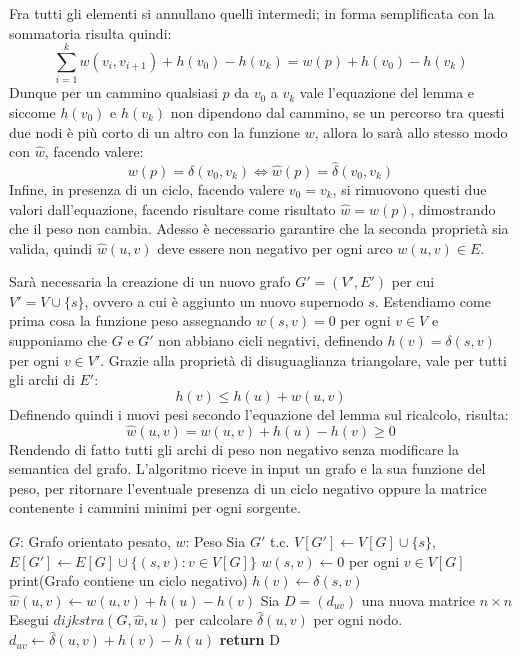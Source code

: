 \noindent Fra tutti gli elementi si annullano quelli intermedi; in forma semplificata con la sommatoria risulta quindi: \[
\sum_{i=1}^k w(v_i, v_{i+1}) + h(v_0) - h(v_k) = w(p) + h(v_0) - h(v_k)
\]
\noindent Dunque per un cammino qualsiasi $p$ da $v_0$ a $v_k$ vale l'equazione del lemma e siccome $h(v_0)$ e $h(v_k)$ non dipendono dal cammino, se
un percorso tra questi due nodi è più corto di un altro con la funzione $w$, allora lo sarà allo stesso modo con $\hat{w}$, facendo valere: \[
w(p) = \delta(v_0, v_k) \iff \hat{w}(p) = \hat{\delta}(v_0, v_k)
\]
\noindent Infine, in presenza di un ciclo, facendo valere $v_0 = v_k$, si rimuovono questi due valori dall'equazione, facendo risultare come risultato
$\hat{w} = w(p)$, dimostrando che il peso non cambia. Adesso è necessario garantire che la seconda proprietà sia valida, quindi $\hat{w}(u, v)$ deve
essere non negativo per ogni arco $w(u,v)\in E$.\par
Sarà necessaria la creazione di un nuovo grafo $G' = (V', E')$ per cui $V' = V \cup \{s\}$, ovvero a cui è aggiunto un nuovo supernodo $s$. Estendiamo
come prima cosa la funzione peso assegnando $w(s, v) = 0$ per ogni $v\in V$ e supponiamo che $G$ e $G'$ non abbiano cicli negativi, definendo
$h(v) = \delta(s,v)$ per ogni $v\in V'$. Grazie alla proprietà di disuguaglianza triangolare, vale per tutti gli archi di $E'$: \[
h(v) \leq h(u) + w(u,v)
\]
\noindent Definendo quindi i nuovi pesi secondo l'equazione del lemma sul ricalcolo, risulta: \[
\hat{w}(u,v) = w(u,v) + h(u) - h(v) \geq 0
\]
\noindent Rendendo di fatto tutti gli archi di peso non negativo senza modificare la semantica del grafo. L'algoritmo riceve in input un grafo e la
sua funzione del peso, per ritornare l'eventuale presenza di un ciclo negativo oppure la matrice contenente i cammini minimi per ogni sorgente.

\begin{algorithm}[h]
	\caption{johnson(G, w)}
	\begin{algorithmic}[i]
		\Require $G$: Grafo orientato pesato, $w$: Peso
		\State Sia $G'$ t.c. $V[G']\gets V[G]\cup \{s\}$, $E[G']\gets E[G]\cup \{(s,v):v\in V[G]\}$
		\State $w(s, v)\gets 0$ per ogni $v\in V[G]$
		\State
		\State print(Grafo contiene un ciclo negativo)
		\Else
		\State $h(v)\gets \delta(s,v)$ 
		\EndFor
		\State $\hat{w}(u,v)\gets w(u,v) + h(u) - h(v)$ 
		\EndFor
		\State Sia $D = (d_{uv})$ una nuova matrice $n\times n$
		\State
		\State Esegui $dijkstra(G, \hat{w}, u)$ per calcolare $\hat{\delta}(u,v)$ per ogni nodo.
		\State $d_{uv}\gets \hat{\delta}(u,v) + h(v) - h(u)$
		\EndFor
		\EndFor
		\State \textbf{return} D
		\EndIf
	\end{algorithmic}	
\end{algorithm}

